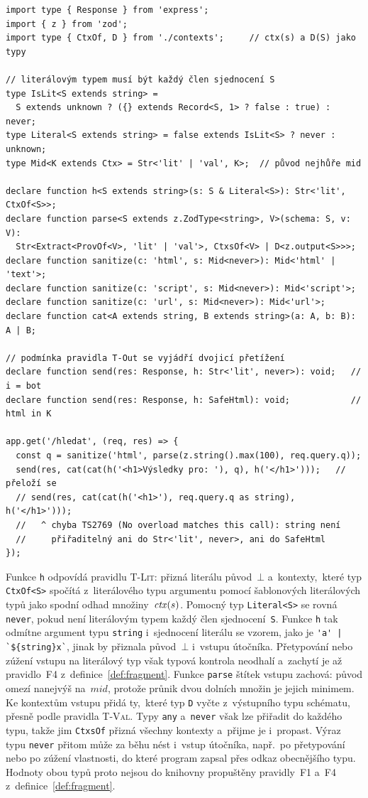 \begin{verbatim}
import type { Response } from 'express';
import { z } from 'zod';
import type { CtxOf, D } from './contexts';     // ctx(s) a D(S) jako typy

// literálovým typem musí být každý člen sjednocení S
type IsLit<S extends string> =
  S extends unknown ? ({} extends Record<S, 1> ? false : true) : never;
type Literal<S extends string> = false extends IsLit<S> ? never : unknown;
type Mid<K extends Ctx> = Str<'lit' | 'val', K>;  // původ nejhůře mid

declare function h<S extends string>(s: S & Literal<S>): Str<'lit', CtxOf<S>>;
declare function parse<S extends z.ZodType<string>, V>(schema: S, v: V):
  Str<Extract<ProvOf<V>, 'lit' | 'val'>, CtxsOf<V> | D<z.output<S>>>;
declare function sanitize(c: 'html', s: Mid<never>): Mid<'html' | 'text'>;
declare function sanitize(c: 'script', s: Mid<never>): Mid<'script'>;
declare function sanitize(c: 'url', s: Mid<never>): Mid<'url'>;
declare function cat<A extends string, B extends string>(a: A, b: B): A | B;

// podmínka pravidla T-Out se vyjádří dvojicí přetížení
declare function send(res: Response, h: Str<'lit', never>): void;   // i = bot
declare function send(res: Response, h: SafeHtml): void;            // html in K

app.get('/hledat', (req, res) => {
  const q = sanitize('html', parse(z.string().max(100), req.query.q));
  send(res, cat(cat(h('<h1>Výsledky pro: '), q), h('</h1>')));   // přeloží se
  // send(res, cat(cat(h('<h1>'), req.query.q as string), h('</h1>')));
  //   ^ chyba TS2769 (No overload matches this call): string není
  //     přiřaditelný ani do Str<'lit', never>, ani do SafeHtml
});
\end{verbatim}

Funkce \texttt{h} odpovídá pravidlu \textsc{T-Lit}: přizná literálu původ~$\bot$ a~kontexty,~které typ \texttt{CtxOf<S>} spočítá z~literálového typu argumentu pomocí šablonových literálových typů jako spodní odhad množiny~$\mathit{ctx}(s)$. Pomocný typ \texttt{Literal<S>} se rovná \texttt{never}, pokud není literálovým typem každý člen sjednocení~\texttt{S}. Funkce \texttt{h} tak odmítne argument typu \texttt{string} i~sjednocení literálu se vzorem, jako je \verb+'a' | `${string}x`+, jinak by přiznala původ~$\bot$ i~vstupu útočníka. Přetypování nebo zúžení vstupu na literálový typ však typová kontrola neodhalí a~zachytí je až pravidlo~F4 z~definice~\ref{def:fragment}. Funkce \texttt{parse} štítek vstupu zachová: původ omezí nanejvýš na~$\mathit{mid}$, protože průnik dvou dolních množin je jejich minimem. Ke kontextům vstupu přidá ty,~které typ \texttt{D} vyčte z~výstupního typu schématu, přesně podle pravidla \textsc{T-Val}. Typy \texttt{any} a~\texttt{never} však lze přiřadit do každého typu, takže jim \texttt{CtxsOf} přizná všechny kontexty a~přijme je i~propast. Výraz typu \texttt{never} přitom může za běhu nést i~vstup útočníka, např.~po přetypování nebo po zúžení vlastnosti, do které program zapsal přes odkaz obecnějšího typu. Hodnoty obou typů proto nejsou do knihovny propuštěny pravidly~F1 a~F4 z~definice~\ref{def:fragment}.

